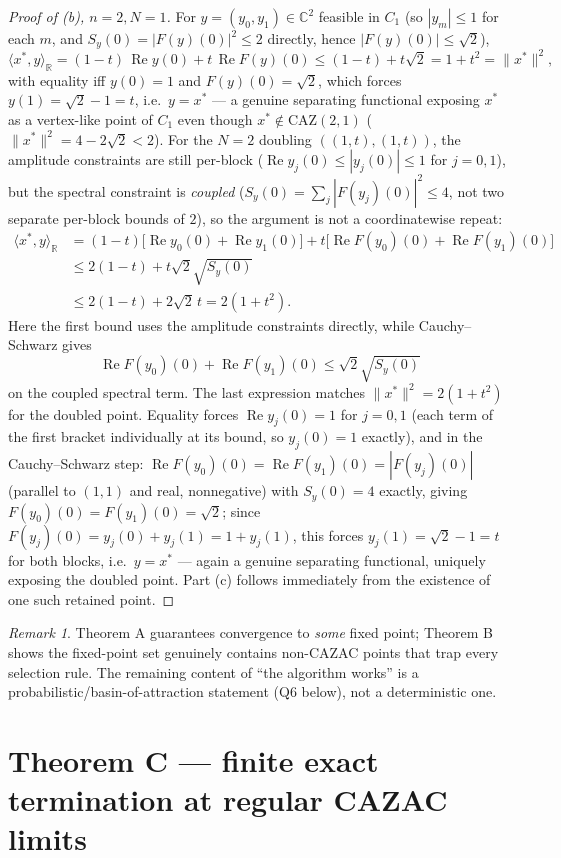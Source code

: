 \documentclass[11pt]{article}
\theoremstyle{plain}
\theoremstyle{definition}
\theoremstyle{remark}
\newtheorem{remark}[theorem]{Remark}
\newcommand{\R}{\mathbb R}
\newcommand{\C}{\mathbb C}
\newcommand{\CAZ}{\mathrm{CAZ}}
\newcommand{\re}{\operatorname{Re}}
\begin{document}
\begin{proof}[Proof of (b), $n=2,N=1$]
For $y=(y_0,y_1)\in\C^2$ feasible in $C_1$ (so $|y_m|\le1$ for each $m$,
and $S_y(0)=|F(y)(0)|^2\le2$ directly, hence $|F(y)(0)|\le\sqrt2$),
$$\langle x^*,y\rangle_\R=(1-t)\,\re y(0)+t\,\re F(y)(0)\le(1-t)+t\sqrt2=1+t^2=\|x^*\|^2,$$
with equality iff $y(0)=1$ and $F(y)(0)=\sqrt2$, which forces
$y(1)=\sqrt2-1=t$, i.e.\ $y=x^*$ --- a genuine separating functional
exposing $x^*$ as a vertex-like point of $C_1$ even though
$x^*\notin\CAZ(2,1)$ ($\|x^*\|^2=4-2\sqrt2<2$). For the $N=2$ doubling
$((1,t),(1,t))$, the amplitude constraints are still per-block
($\re y_j(0)\le|y_j(0)|\le1$ for $j=0,1$), but the spectral constraint is
\emph{coupled} ($S_y(0)=\sum_j|F(y_j)(0)|^2\le4$, not two separate
per-block bounds of $2$), so the argument is not a coordinatewise repeat:
\begin{align*}
\langle x^*,y\rangle_\R
 &= (1-t)\bigl[\re y_0(0)+\re y_1(0)\bigr]
    +t\bigl[\re F(y_0)(0)+\re F(y_1)(0)\bigr]\\
 &\le 2(1-t)+t\sqrt2\sqrt{S_y(0)}\\
 &\le 2(1-t)+2\sqrt2\,t=2(1+t^2).
\end{align*}
Here the first bound uses the amplitude constraints directly, while
Cauchy--Schwarz gives
\[
\re F(y_0)(0)+\re F(y_1)(0)\le\sqrt2\sqrt{S_y(0)}
\]
on the coupled spectral term. The last expression matches
$\|x^*\|^2=2(1+t^2)$ for the
doubled point. Equality forces $\re y_j(0)=1$ for $j=0,1$ (each term of
the first bracket individually at its bound, so $y_j(0)=1$ exactly), and
in the Cauchy--Schwarz step: $\re F(y_0)(0)=\re F(y_1)(0)=|F(y_j)(0)|$
(parallel to $(1,1)$ and real, nonnegative) with $S_y(0)=4$ exactly,
giving $F(y_0)(0)=F(y_1)(0)=\sqrt2$; since $F(y_j)(0)=y_j(0)+y_j(1)=1+y_j(1)$,
this forces $y_j(1)=\sqrt2-1=t$ for both blocks, i.e.\ $y=x^*$ ---
again a genuine separating functional, uniquely exposing the doubled
point. Part (c) follows immediately from the existence of one such
retained point.
\end{proof}

\begin{remark}
Theorem A guarantees convergence to \emph{some} fixed point; Theorem B
shows the fixed-point set genuinely contains non-CAZAC points that trap
every selection rule. The remaining content of ``the algorithm works'' is a
probabilistic/basin-of-attraction statement (Q6 below), not a deterministic
one.
\end{remark}

\section{Theorem C --- finite exact termination at regular CAZAC limits}
\end{document}
